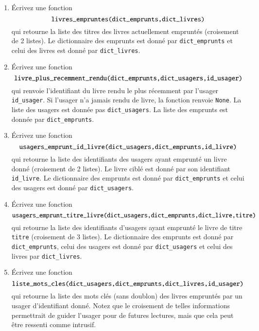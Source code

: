 \documentclass[10pt,a4paper]{sujets-exercices}
\begin{document}
\begin{enumerate}

\item Écrivez une fonction $$\mbox{\texttt{livres\_empruntes(dict\_emprunts,dict\_livres)}}$$ qui retourne la liste des titres des livres actuellement empruntés (croisement de 2 listes). Le dictionnaire des emprunts est donné par \texttt{dict\_emprunts} et celui des livres est donné par \texttt{dict\_livres}.

\item Écrivez une fonction $$\mbox{\texttt{livre\_plus\_recemment\_rendu(dict\_emprunts,dict\_usagers,id\_usager)}}$$ qui renvoie l'identifiant du livre rendu le plus récemment par l'usager \texttt{id\_usager}. Si l'usager n'a jamais rendu de livre, la fonction renvoie \texttt{None}. La liste des usagers est donnée pas \texttt{dict\_usagers}. La liste des emprunts est donnée par \texttt{dict\_emprunts}.

\item Écrivez une fonction $$\mbox{\texttt{usagers\_emprunt\_id\_livre(dict\_usagers,dict\_emprunts,id\_livre)}}$$ qui retourne la liste des identifiants des usagers ayant emprunté un livre donné (croisement de 2 listes). Le livre ciblé est donné par son identifiant \texttt{id\_livre}. Le dictionnaire des emprunts est donné par \texttt{dict\_emprunts} et celui des usagers est donné par \texttt{dict\_usagers}.

\item Écrivez une fonction $$\mbox{\texttt{usagers\_emprunt\_titre\_livre(dict\_usagers,dict\_emprunts,dict\_livre,titre)}}$$ qui retourne la liste des identifiants d'usagers ayant emprunté le livre de titre \texttt{titre} (croisement de 3 listes). Le dictionnaire des emprunts est donné par \texttt{dict\_emprunts}, celui des usagers est donné par \texttt{dict\_usagers} et celui des livres par \texttt{dict\_livres}.


\item Écrivez une fonction $$\mbox{\texttt{liste\_mots\_cles(dict\_usagers,dict\_emprunts,dict\_livres,id\_usager)}}$$ qui retourne la liste des mots clés (sans doublon) des livres empruntés par un usager d'identifiant donné. Notez que le croisement de telles informations permettrait de guider l'usager pour de futures lectures, mais que cela peut être ressenti comme intrusif.


\end{enumerate}
\end{document}

